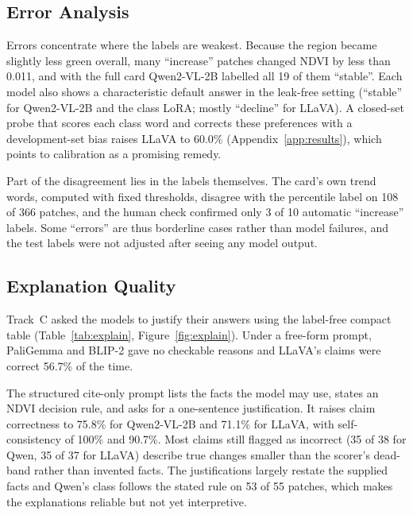 \documentclass[11pt]{article}
\begin{document}
\subsection{Error Analysis}

Errors concentrate where the labels are weakest. Because the region
became slightly less green overall, many ``increase'' patches changed
NDVI by less than 0.011, and with the full card Qwen2-VL-2B labelled all
19 of them ``stable''. Each model also shows a characteristic default
answer in the leak-free setting (``stable'' for Qwen2-VL-2B and the
class LoRA; mostly ``decline'' for LLaVA). A
closed-set probe that scores each class word and corrects these
preferences with a development-set bias raises LLaVA to 60.0\%
(Appendix~\ref{app:results}), which points to calibration as a promising
remedy.

Part of the disagreement lies in the labels themselves. The card's own
trend words, computed with fixed thresholds, disagree with the
percentile label on 108 of 366 patches, and the human check confirmed
only 3 of 10 automatic ``increase'' labels. Some ``errors'' are thus
borderline cases rather than model failures, and the test labels were
not adjusted after seeing any model output.

\subsection{Explanation Quality}
\label{sec:expl}

Track~C asked the models to justify their answers using the label-free
compact table (Table~\ref{tab:explain}, Figure~\ref{fig:explain}). Under
a free-form prompt, PaliGemma and BLIP-2 gave no checkable reasons and
LLaVA's claims were correct 56.7\% of the time.

The structured cite-only prompt lists the facts the model may use,
states an NDVI decision rule, and asks for a one-sentence justification.
It raises claim correctness to 75.8\% for Qwen2-VL-2B and 71.1\% for
LLaVA, with self-consistency of 100\% and 90.7\%. Most claims still
flagged as incorrect (35 of 38 for Qwen, 35 of 37 for LLaVA) describe
true changes smaller than the scorer's dead-band rather than invented
facts. The justifications largely restate the supplied
facts and Qwen's class follows the stated rule on 53 of 55 patches, which
makes the explanations reliable but not yet interpretive.
\end{document}
